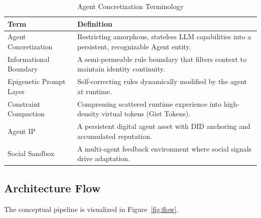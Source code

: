 \documentclass[10pt,journal,compsoc]{IEEEtran}
\begin{document}
\begin{table}[h]
\centering
\caption{Agent Concretization Terminology}
\label{tab:terminology}
\begin{tabular}{lp{5.5cm}}
\toprule
\textbf{Term} & \textbf{Definition} \\
\midrule
Agent Concretization & Restricting amorphous, stateless LLM capabilities into a persistent, recognizable Agent entity. \\
\midrule
Informational Boundary & A semi-permeable rule boundary that filters context to maintain identity continuity. \\
\midrule
Epigenetic Prompt Layer & Self-correcting rules dynamically modified by the agent at runtime. \\
\midrule
Constraint Compaction & Compressing scattered runtime experience into high-density virtual tokens (Gist Tokens). \\
\midrule
Agent IP & A persistent digital agent asset with DID anchoring and accumulated reputation. \\
\midrule
Social Sandbox & A multi-agent feedback environment where social signals drive adaptation. \\
\bottomrule
\end{tabular}
\end{table}

\subsection{Architecture Flow}
The conceptual pipeline is visualized in Figure~\ref{fig:flow}.
\end{document}
